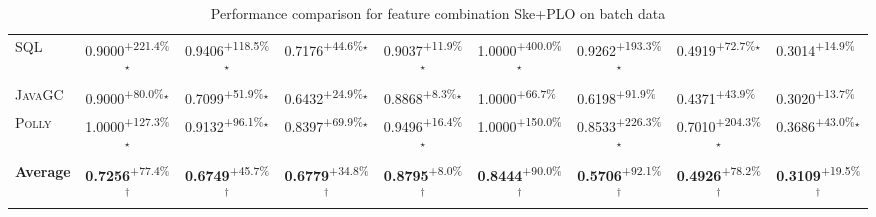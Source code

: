 \begin{table}[htbp]
\begin{tabular}{l|cccc|cccc}
\textsc{SQL} & \cellcolor{green!30}0.9000\textsuperscript{+221.4\%}$^\star$ & \cellcolor{green!30}0.9406\textsuperscript{+118.5\%}$^\star$ & \cellcolor{green!30}0.7176\textsuperscript{+44.6\%}$^\star$ & \cellcolor{green!30}0.9037\textsuperscript{+11.9\%}$^\star$ & \cellcolor{green!30}1.0000\textsuperscript{+400.0\%}$^\star$ & \cellcolor{green!30}0.9262\textsuperscript{+193.3\%}$^\star$ & \cellcolor{green!30}0.4919\textsuperscript{+72.7\%}$^\star$ & \cellcolor{green!30}0.3014\textsuperscript{+14.9\%}$^{\,\,\,}$ \\
\textsc{JavaGC} & \cellcolor{green!30}0.9000\textsuperscript{+80.0\%}$^\star$ & \cellcolor{green!30}0.7099\textsuperscript{+51.9\%}$^\star$ & \cellcolor{green!30}0.6432\textsuperscript{+24.9\%}$^\star$ & \cellcolor{green!30}0.8868\textsuperscript{+8.3\%}$^\star$ & \cellcolor{green!30}1.0000\textsuperscript{+66.7\%}$^{\,\,\,}$ & \cellcolor{green!30}0.6198\textsuperscript{+91.9\%}$^{\,\,\,}$ & \cellcolor{green!30}0.4371\textsuperscript{+43.9\%}$^{\,\,\,}$ & \cellcolor{green!30}0.3020\textsuperscript{+13.7\%}$^{\,\,\,}$ \\
\textsc{Polly} & \cellcolor{green!30}1.0000\textsuperscript{+127.3\%}$^\star$ & \cellcolor{green!30}0.9132\textsuperscript{+96.1\%}$^\star$ & \cellcolor{green!30}0.8397\textsuperscript{+69.9\%}$^\star$ & \cellcolor{green!30}0.9496\textsuperscript{+16.4\%}$^\star$ & \cellcolor{green!30}1.0000\textsuperscript{+150.0\%}$^{\,\,\,}$ & \cellcolor{green!30}0.8533\textsuperscript{+226.3\%}$^\star$ & \cellcolor{green!30}0.7010\textsuperscript{+204.3\%}$^\star$ & \cellcolor{green!30}0.3686\textsuperscript{+43.0\%}$^\star$ \\
\hline
\textbf{Average} & \cellcolor{green!30}\textbf{0.7256}\textsuperscript{+77.4\%}$^\dagger$ & \cellcolor{green!30}\textbf{0.6749}\textsuperscript{+45.7\%}$^\dagger$ & \cellcolor{green!30}\textbf{0.6779}\textsuperscript{+34.8\%}$^\dagger$ & \cellcolor{green!30}\textbf{0.8795}\textsuperscript{+8.0\%}$^\dagger$ & \cellcolor{green!30}\textbf{0.8444}\textsuperscript{+90.0\%}$^\dagger$ & \cellcolor{green!30}\textbf{0.5706}\textsuperscript{+92.1\%}$^\dagger$ & \cellcolor{green!30}\textbf{0.4926}\textsuperscript{+78.2\%}$^\dagger$ & \cellcolor{green!30}\textbf{0.3109}\textsuperscript{+19.5\%}$^\dagger$ \\
\hline
\end{tabular}
\caption{Performance comparison for feature combination Ske+PLO on batch data}
\label{tab:combo_Ske_PLO_performance_batch}
\end{table}